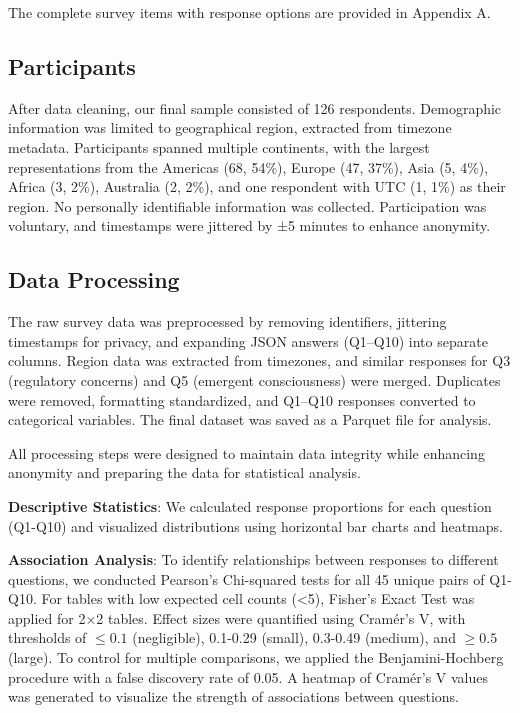 \documentclass{article}
\begin{document}
The complete survey items with response options are provided in Appendix
A.

\subsection{Participants}\label{participants}

After data cleaning, our final sample consisted of 126 respondents.
Demographic information was limited to geographical region, extracted
from timezone metadata. Participants spanned multiple continents, with
the largest representations from the Americas (68, 54\%), Europe (47,
37\%), Asia (5, 4\%), Africa (3, 2\%), Australia (2, 2\%), and one
respondent with UTC (1, 1\%) as their region. No personally identifiable
information was collected. Participation was voluntary,
and timestamps were jittered by ±5 minutes to enhance anonymity.

\subsection{Data Processing}\label{data-processing}

The raw survey data was preprocessed by removing identifiers, jittering timestamps for privacy, and expanding JSON answers (Q1–Q10) into separate columns. Region data was extracted from timezones, and similar responses for Q3 (regulatory concerns) and Q5 (emergent consciousness) were merged. Duplicates were removed, formatting standardized, and Q1–Q10 responses converted to categorical variables. The final dataset was saved as a Parquet file for analysis.

All processing steps were designed to maintain data integrity while
enhancing anonymity and preparing the data for statistical analysis.

\textbf{Descriptive Statistics}: We calculated response proportions for
each question (Q1-Q10) and visualized distributions using horizontal bar
charts and heatmaps.

\textbf{Association Analysis}: To identify relationships between
responses to different questions, we conducted Pearson's Chi-squared
tests for all 45 unique pairs of Q1-Q10. For tables with low expected cell
counts (\textless5), Fisher's Exact Test was applied for 2×2 tables.
Effect sizes were quantified using Cramér's V, with thresholds of
$\leq 0.1$ (negligible), 0.1-0.29 (small), 0.3-0.49 (medium), and $\geq 0.5$ (large). To control for multiple comparisons, we applied the
Benjamini-Hochberg procedure with a false discovery rate of 0.05. A
heatmap of Cramér's V values was generated to visualize the strength of
associations between questions.
\end{document}
